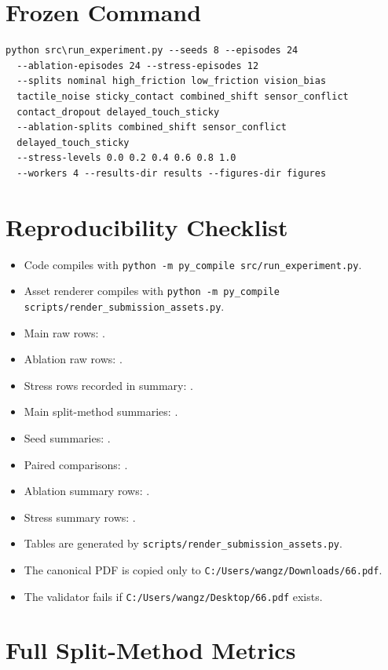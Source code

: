 \documentclass{article}
\begin{document}
\section{Frozen Command}

\begin{verbatim}
python src\run_experiment.py --seeds 8 --episodes 24
  --ablation-episodes 24 --stress-episodes 12
  --splits nominal high_friction low_friction vision_bias
  tactile_noise sticky_contact combined_shift sensor_conflict
  contact_dropout delayed_touch_sticky
  --ablation-splits combined_shift sensor_conflict
  delayed_touch_sticky
  --stress-levels 0.0 0.2 0.4 0.6 0.8 1.0
  --workers 4 --results-dir results --figures-dir figures
\end{verbatim}

\section{Reproducibility Checklist}

\begin{itemize}
  \item Code compiles with \texttt{python -m py\_compile src/run\_experiment.py}.
  \item Asset renderer compiles with \texttt{python -m py\_compile scripts/render\_submission\_assets.py}.
  \item Main raw rows: \MainRows{}.
  \item Ablation raw rows: \AblationRows{}.
  \item Stress rows recorded in summary: \StressRows{}.
  \item Main split-method summaries: \MetricRows{}.
  \item Seed summaries: \SeedRows{}.
  \item Paired comparisons: \PairwiseRows{}.
  \item Ablation summary rows: \AblationSummaryRows{}.
  \item Stress summary rows: \StressSummaryRows{}.
  \item Tables are generated by \texttt{scripts/render\_submission\_assets.py}.
  \item The canonical PDF is copied only to \texttt{C:/Users/wangz/Downloads/66.pdf}.
  \item The validator fails if \texttt{C:/Users/wangz/Desktop/66.pdf} exists.
\end{itemize}

\section{Full Split-Method Metrics}
\end{document}
